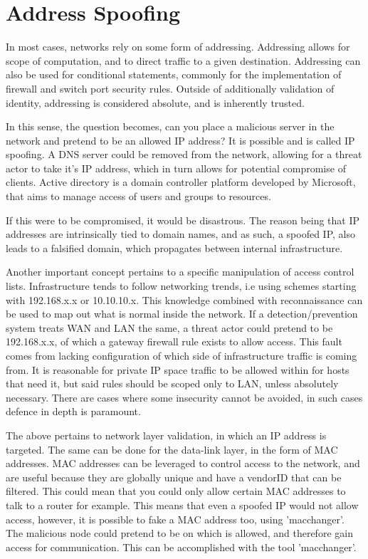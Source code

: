 \section{Address Spoofing}
In most cases, networks rely on some form of addressing. Addressing allows for scope of computation, and to direct traffic to a given destination. 
Addressing can also be used for conditional statements, commonly for the implementation of firewall and switch port security rules. Outside of additionally validation of identity, addressing
is considered absolute, and is inherently trusted. \citep{IPMACSpoofing}

In this sense, the question becomes, can you place a malicious server in the network and pretend to be an allowed IP address? It is possible and is called IP spoofing. A DNS server could be removed from the network, allowing for a threat actor to take it's IP address, 
which in turn allows for potential compromise of clients. Active directory is a domain controller platform developed by Microsoft, that aims to manage access of users and groups to resources. 

If this were to be compromised, it would be disastrous. The reason being that IP addresses are intrinsically tied to domain names, and as such, a spoofed IP, also leads to a falsified domain,
which propagates between internal infrastructure. \citep{DNSSpoofing}

Another important concept pertains to a specific manipulation of access control lists. Infrastructure tends to follow networking trends, i.e using schemes starting with 192.168.x.x or 10.10.10.x. This knowledge combined with reconnaissance can be used to map out what is normal inside the network.
If a detection/prevention system treats WAN and LAN the same, a threat actor could pretend to be 192.168.x.x, of which a gateway firewall rule exists to allow access. This fault comes from lacking configuration of which side of infrastructure traffic is coming from. 
It is reasonable for private IP space traffic to be allowed within for hosts that need it, but said rules should be scoped only to LAN, unless absolutely necessary. There are cases where some insecurity cannot be avoided, in such cases defence in depth is paramount.

The above pertains to network layer validation, in which an IP address is targeted. The same can be done for the data-link layer, in the form of MAC addresses. MAC addresses can be leveraged to control access to the network, and are useful because they are globally unique and have a vendorID that can be filtered.
This could mean that you could only allow certain MAC addresses to talk to a router for example. This means that even a spoofed IP would not allow access, however, it is possible to fake a MAC address too, using 'macchanger'. The malicious node could pretend to be on which is allowed, and therefore gain access for communication. 
This can be accomplished with the tool 'macchanger'. \citep{IPMACSpoofing}

